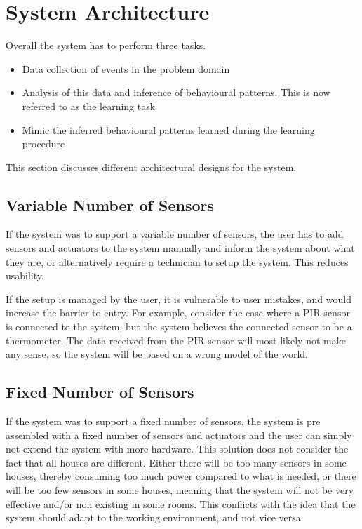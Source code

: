 \section{System Architecture}\label{sec:architecture}

Overall the system has to perform three tasks.

\begin{itemize}
\item Data collection of events in the problem domain
\item Analysis of this data and inference of behavioural patterns. This is now referred to as the learning task
\item Mimic the inferred behavioural patterns learned during the learning procedure
\end{itemize}
This section discusses different architectural designs for the system.

\subsection{Variable Number of Sensors}
If the system was to support a variable number of sensors, the user has to add sensors and actuators to the system manually and inform the system about what they are, or alternatively require a technician to setup the system. This reduces usability.

If the setup is managed by the user, it is vulnerable to user mistakes, and would increase the barrier to entry. For example, consider the case where a PIR sensor is connected to the system, but the system believes the connected sensor to be a thermometer. The data received from the PIR sensor will most likely not make any sense, so the system will be based on a wrong model of the world.

\subsection{Fixed Number of Sensors}
If the system was to support a fixed number of sensors, the system is pre assembled with a fixed number of sensors and actuators and the user can simply not extend the system with more hardware. This solution does not consider the fact that all houses are different. Either there will be too many sensors in some houses, thereby consuming too much power compared to what is needed, or there will be too few sensors in some houses, meaning that the system will not be very effective and/or non existing in some rooms. This conflicts with the idea that the system should adapt to the working environment, and not vice versa.

